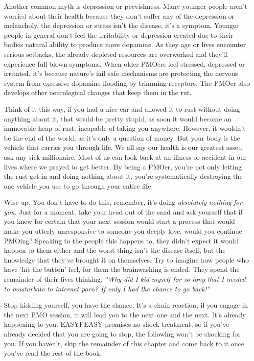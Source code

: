 \documentclass[easypeasy.tex]{subfiles}
\begin{document}
Another common myth is depression or peevishness. Many younger people aren't worried about their health because they don't suffer any of the depression or melancholy, the depression or stress isn't the disease, it's a symptom. Younger people in general don't feel the irritability or depression created due to their bodies natural ability to produce more dopamine. As they age or lives encounter serious setbacks, the already depleted resources are overworked and they'll experience full blown symptoms. When older PMOers feel stressed, depressed or irritated, it's because nature's fail safe mechanisms are protecting the nervous system from excessive dopamine flooding by trimming receptors. The PMOer also develops other neurological changes that keep them in the rut.

Think of it this way, if you had a nice car and allowed it to rust without doing anything about it, that would be pretty stupid, as soon it would become an immovable heap of rust, incapable of taking you anywhere. However, it wouldn't be the end of the world, as it's only a question of money. But your body is the vehicle that carries you through life. We all say our health is our greatest asset, ask any sick millionaire. Most of us can look back at an illness or accident in our lives where we prayed to get better. By being a PMOer, you're not only letting the rust get in and doing nothing about it, you're systematically destroying the one vehicle you use to go through your entire life.

Wise up. You don't have to do this, remember, it's doing \textit{absolutely nothing for you.} Just for a moment, take your head out of the sand and ask yourself that if you knew for certain that your next session would start a process that would make you utterly unresponsive to someone you deeply love, would you continue PMOing? Speaking to the people this happens to, they didn't expect it would happen to them either and the worst thing isn't the disease itself, but the knowledge that they've brought it on themselves. Try to imagine how people who have 'hit the button' feel, for them the brainwashing is ended. They spend the remainder of their lives thinking, \textit{"Why did I kid myself for so long that I needed to masturbate to internet porn? If only I had the chance to go back!"}

Stop kidding yourself, you have the chance. It's a chain reaction, if you engage in the next PMO session, it will lead you to the next one and the next. It's already happening to you. EASYPEASY promises no shock treatment, so if you've already decided that you are going to stop, the following won't be shocking for you. If you haven't, skip the remainder of this chapter and come back to it once you've read the rest of the book.
\end{document}
